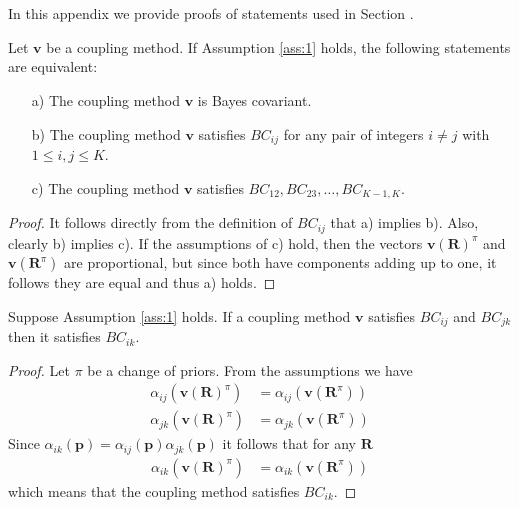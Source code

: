 \appendix

\section{}
\label{app:bc1}

In this appendix we provide proofs of statements used in Section \label{sec:bc2}.

\begin{prop} \label{prop:bcprop}
	Let $\boldsymbol{v}$ be a coupling method. If Assumption \ref{ass:1} holds, the following statements are equivalent:
	\begin{itemize}
		\item[a)] The coupling method $\boldsymbol{v}$ is Bayes covariant.
		\item[b)] The coupling method $\boldsymbol{v}$ satisfies $BC_{ij}$ for any pair of integers  $i\not= j$ with $1\leq i,j \leq K$.
		\item[c)] The coupling method $\boldsymbol{v}$ satisfies $BC_{12}, BC_{23}, \ldots, BC_{K-1,K}$.
	\end{itemize}
\end{prop}
\begin{proof}
It follows directly from the definition of $BC_{ij}$ that a) implies b). Also, clearly b) implies c). If the assumptions of c) hold, then the vectors $\boldsymbol{v}(\boldsymbol{R})^\pi$ and $ \boldsymbol{v}(\boldsymbol{R}^\pi)$ are proportional, but since both have components adding up to one, it follows they are equal and thus a) holds.
\end{proof}

\begin{lem} \label{lem:transitivity}
	Suppose Assumption \ref{ass:1} holds. If a coupling method $\boldsymbol{v}$ satisfies $BC_{ij}$ and $BC_{jk}$ then it satisfies $BC_{ik}$.
\end{lem}
\begin{proof}
	Let $\pi$ be a change of priors. From the assumptions we have 
	\begin{align}
		\alpha_{ij}(\boldsymbol{v}(\boldsymbol{R})^\pi ) &= \alpha_{ij}(\boldsymbol{v}(\boldsymbol{R}^\pi) ) \\
		\alpha_{jk}(\boldsymbol{v}(\boldsymbol{R})^\pi ) &= \alpha_{jk}(\boldsymbol{v}(\boldsymbol{R}^\pi) )
	\end{align}
	Since $\alpha_{ik}(\boldsymbol{p}) = \alpha_{ij}(\boldsymbol{p})  \alpha_{jk}(\boldsymbol{p})$ it follows that for any $\boldsymbol{R}$
	\begin{align}
		\alpha_{ik}(\boldsymbol{v}(\boldsymbol{R})^\pi ) &= \alpha_{ik}(\boldsymbol{v}(\boldsymbol{R}^\pi) )
	\end{align}
	which means that the coupling method satisfies $BC_{ik}$.
\end{proof}

